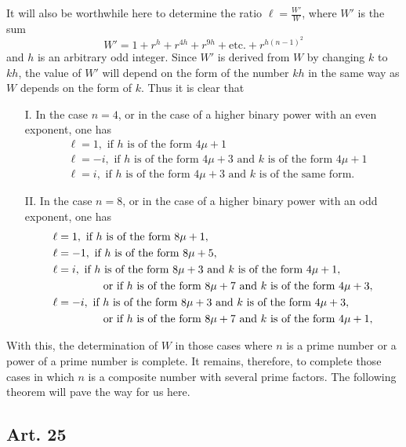 \documentclass{book}
\theoremstyle{plain}
\theoremstyle{remark}
\begin{document}
It will also be worthwhile here to determine the ratio $\ell = \frac{W'}{W}$, where $W'$ is the sum
\[ W' = 1 + r^h + r^{4h} + r^{9h} + \textrm{etc.}+r^{h(n-1)^2} \]
and $h$ is an arbitrary odd integer.  Since $W'$ is derived from $W$ by changing $k$ to $kh$, the value of $W'$ will depend on the form of the number $kh$ in the same way as $W$ depends on the form of $k$.  Thus it is clear that
\begin{enumerate}
\item[I.]  In the case $n=4$, or in the case of a higher binary power with an even exponent, one has
\begin{align*} 
& \ell = 1,\textrm{ if }h\textrm{ is of the form }4\mu+1 \\
& \ell = -i,\textrm{ if }h\textrm{ is of the form }4\mu+3\textrm{ and }k\textrm{ is of the form }4\mu+1\\
& \ell = i,\textrm{ if }h\textrm{ is of the form }4\mu+3\textrm{ and }k\textrm{ is of the same form. } 
\end{align*}
\item[II.] In the case $n=8$, or in the case of a higher binary power with an odd exponent, one has
\begin{align*} 
 &\ell = 1,\textrm{ if }h\textrm{ is of the form }8\mu+1, \\
 &\ell = -1,\textrm{ if }h\textrm{ is of the form }8\mu+5,\\
 &\ell = i,\textrm{ if }h\textrm{ is of the form }8\mu+3\textrm{ and }k\textrm{ is of the form } 4\mu+1,\\
 & \hspace{1.5cm} \textrm{ or if }h\textrm{ is of the form }8\mu+7\textrm{ and }k\textrm{ is of the form } 4\mu+3, \\
 &\ell = -i,\textrm{ if }h\textrm{ is of the form }8\mu+3\textrm{ and }k\textrm{ is of the form } 4\mu+3,\\
 &\hspace{1.5cm}  \textrm{ or if }h\textrm{ is of the form }8\mu+7\textrm{ and }k\textrm{ is of the form } 4\mu+1,
\end{align*}
\end{enumerate}
With this, the determination of $W$ in those cases where $n$ is a prime number or a power of a prime number is complete.  It remains, therefore, to complete those cases in which $n$ is a composite number with several prime factors.  The following theorem will pave the way for us here.

\subsection*{Art. 25}
\end{document}
